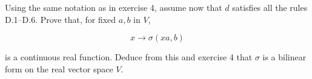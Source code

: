 Using the same notation as in exercise 4, assume now that $d$ satisfies all the rules D.1--D.6. Prove that, for fixed $a, b$ in $V$,

$$x \rightarrow \sigma(xa, b)$$

is a continuous real function. Deduce from this and exercise 4 that $\sigma$ is a bilinear form on the real vector space $V$.
